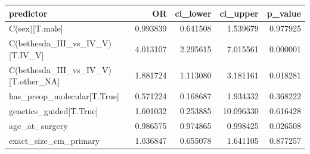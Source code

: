 \begin{tabular}{lrrrr}
\toprule
predictor & OR & ci_lower & ci_upper & p_value \\
\midrule
C(sex)[T.male] & 0.993839 & 0.641508 & 1.539679 & 0.977925 \\
C(bethesda_III_vs_IV_V)[T.IV_V] & 4.013107 & 2.295615 & 7.015561 & 0.000001 \\
C(bethesda_III_vs_IV_V)[T.other_NA] & 1.881724 & 1.113080 & 3.181161 & 0.018281 \\
has_preop_molecular[T.True] & 0.571224 & 0.168687 & 1.934332 & 0.368222 \\
genetics_guided[T.True] & 1.601032 & 0.253885 & 10.096330 & 0.616428 \\
age_at_surgery & 0.986575 & 0.974865 & 0.998425 & 0.026508 \\
exact_size_cm_primary & 1.036847 & 0.655078 & 1.641105 & 0.877257 \\
\bottomrule
\end{tabular}
